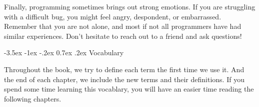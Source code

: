 \documentclass[12pt]{book}
\makeatletter
\theoremstyle{exercise}
\renewcommand{\section}{\@startsection {section}{1}{\z@}%
    {-3.5ex \@plus -1ex \@minus -.2ex}%
    {0.7ex \@plus.2ex}%
    {\normalfont\Large\bfseries}}
\makeatother
\begin{document}
Finally, programming sometimes brings out strong emotions.
If you are struggling with a difficult bug, you might feel angry, despondent, or embarrassed.
Remember that you are not alone, and most if not all programmers have had similar experiences.
Don't hesitate to reach out to a friend and ask questions!







\section{Vocabulary}

Throughout the book, we try to define each term the first time we use
it.
And the end of each chapter, we include the new terms and their definitions.
If you spend some time learning this vocablary, you will have an easier time reading the following chapters.
\end{document}
